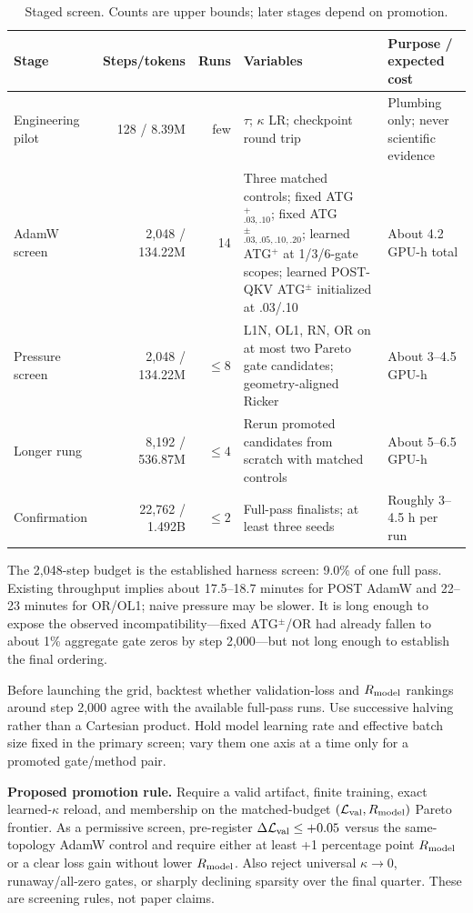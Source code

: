 \documentclass[10pt]{article}
\newcommand{\pct}{\%}
\newcommand{\Rmodel}{R_{\rm model}}
\begin{document}
\begin{table}[H]
\centering
\caption{Staged screen. Counts are upper bounds; later stages depend on promotion.}
\label{tab:screen}
\scriptsize
\setlength{\tabcolsep}{4.2pt}
\begin{tabularx}{\textwidth}{lrrXX}
\toprule
Stage & Steps/tokens & Runs & Variables & Purpose / expected cost \\
\midrule
Engineering pilot & 128 / 8.39M & few & $\tau$; $\kappa$ LR; checkpoint round trip & Plumbing only; never scientific evidence \\
AdamW screen & 2,048 / 134.22M & 14 & Three matched controls; fixed ATG$^+_{.03,.10}$; fixed ATG$^{\pm}_{.03,.05,.10,.20}$; learned ATG$^+$ at 1/3/6-gate scopes; learned POST-QKV ATG$^{\pm}$ initialized at .03/.10 & About 4.2 GPU-h total \\
Pressure screen & 2,048 / 134.22M & $\leq8$ & L1N, OL1, RN, OR on at most two Pareto gate candidates; geometry-aligned Ricker & About 3--4.5 GPU-h \\
Longer rung & 8,192 / 536.87M & $\leq4$ & Rerun promoted candidates from scratch with matched controls & About 5--6.5 GPU-h \\
Confirmation & 22,762 / 1.492B & $\leq2$ & Full-pass finalists; at least three seeds & Roughly 3--4.5 h per run \\
\bottomrule
\end{tabularx}
\end{table}

The 2,048-step budget is the established harness screen: 9.0\pct{} of one full pass. Existing throughput implies about 17.5--18.7 minutes for POST AdamW and 22--23 minutes for OR/OL1; naive pressure may be slower. It is long enough to expose the observed incompatibility---fixed ATG$^{\pm}$/OR had already fallen to about 1\pct{} aggregate gate zeros by step 2,000---but not long enough to establish the final ordering.

Before launching the grid, backtest whether validation-loss and $\Rmodel$ rankings around step 2,000 agree with the available full-pass runs. Use successive halving rather than a Cartesian product. Hold model learning rate and effective batch size fixed in the primary screen; vary them one axis at a time only for a promoted gate/method pair.

\textbf{Proposed promotion rule.} Require a valid artifact, finite training, exact learned-$\kappa$ reload, and membership on the matched-budget $(\mathcal{L}_{\rm val},\Rmodel)$ Pareto frontier. As a permissive screen, pre-register $\Delta\mathcal{L}_{\rm val}\leq+0.05$ versus the same-topology AdamW control and require either at least +1 percentage point $\Rmodel$ or a clear loss gain without lower $\Rmodel$. Also reject universal $\kappa\rightarrow0$, runaway/all-zero gates, or sharply declining sparsity over the final quarter. These are screening rules, not paper claims.
\end{document}
